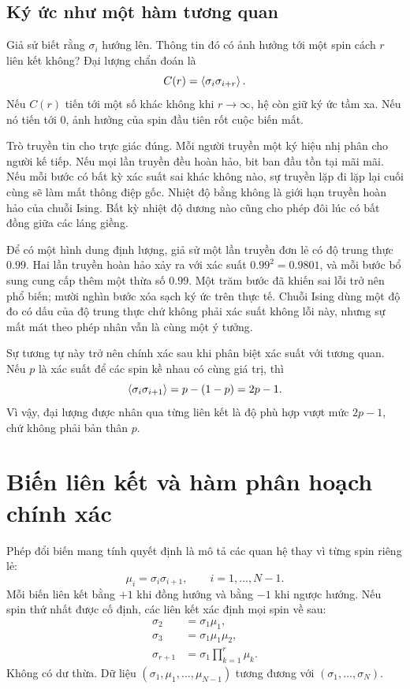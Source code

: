 \subsection{Ký ức như một hàm tương quan}

Giả sử biết rằng \(\sigma_i\) hướng lên. Thông tin đó có ảnh hưởng tới một spin cách \(r\) liên kết không? Đại lượng chẩn đoán là
\begin{equation}
C(r)=\left\langle\sigma_i\sigma_{i+r}\right\rangle.
\end{equation}
Nếu \(C(r)\) tiến tới một số khác không khi \(r\to\infty\), hệ còn giữ ký ức tầm xa. Nếu nó tiến tới 0, ảnh hưởng của spin đầu tiên rốt cuộc biến mất.

Trò truyền tin cho trực giác đúng. Mỗi người truyền một ký hiệu nhị phân cho người kế tiếp. Nếu mọi lần truyền đều hoàn hảo, bit ban đầu tồn tại mãi mãi. Nếu mỗi bước có bất kỳ xác suất sai khác không nào, sự truyền lặp đi lặp lại cuối cùng sẽ làm mất thông điệp gốc. Nhiệt độ bằng không là giới hạn truyền hoàn hảo của chuỗi Ising. Bất kỳ nhiệt độ dương nào cũng cho phép đôi lúc có bất đồng giữa các láng giềng.

Để có một hình dung định lượng, giả sử một lần truyền đơn lẻ có độ trung thực \(0.99\). Hai lần truyền hoàn hảo xảy ra với xác suất \(0.99^2=0.9801\), và mỗi bước bổ sung cung cấp thêm một thừa số \(0.99\). Một trăm bước đã khiến sai lỗi trở nên phổ biến; mười nghìn bước xóa sạch ký ức trên thực tế. Chuỗi Ising dùng một độ đo có dấu của độ trung thực chứ không phải xác suất không lỗi này, nhưng sự mất mát theo phép nhân vẫn là cùng một ý tưởng.

Sự tương tự này trở nên chính xác sau khi phân biệt xác suất với tương quan. Nếu \(p\) là xác suất để các spin kề nhau có cùng giá trị, thì
\begin{equation}
\left\langle\sigma_i\sigma_{i+1}\right\rangle
=p-(1-p)=2p-1.
\end{equation}
Vì vậy, đại lượng được nhân qua từng liên kết là độ phù hợp vượt mức \(2p-1\), chứ không phải bản thân \(p\).

\section{Biến liên kết và hàm phân hoạch chính xác}

Phép đổi biến mang tính quyết định là mô tả các quan hệ thay vì từng spin riêng lẻ:
\begin{equation}
\mu_i=\sigma_i\sigma_{i+1},
\qquad i=1,\ldots,N-1.
\label{eq:bond-variable}
\end{equation}
Mỗi biến liên kết bằng \(+1\) khi đồng hướng và bằng \(-1\) khi ngược hướng. Nếu spin thứ nhất được cố định, các liên kết xác định mọi spin về sau:
\begin{align}
\sigma_2&=\sigma_1\mu_1,\\
\sigma_3&=\sigma_1\mu_1\mu_2,\\
\sigma_{r+1}&=\sigma_1\prod_{k=1}^{r}\mu_k.
\end{align}
Không có dư thừa. Dữ liệu \((\sigma_1,\mu_1,\ldots,\mu_{N-1})\) tương đương với \((\sigma_1,\ldots,\sigma_N)\).

